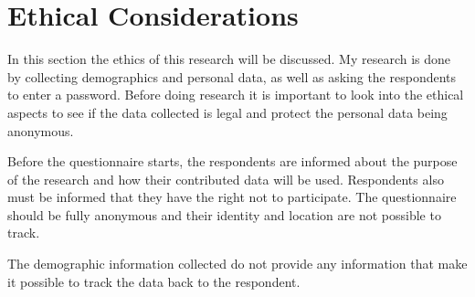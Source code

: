 \section{Ethical Considerations}

	In this section the ethics of this research will be discussed. My research is done by collecting demographics and personal data, as well as asking the respondents to enter a password. Before doing research it is important to look into the ethical aspects to see if the data collected is legal and protect the personal data being anonymous. 

	Before the questionnaire starts, the respondents are informed about the purpose of the research and how their contributed data will be used. Respondents also must be informed that they have the right not to participate. The questionnaire should be fully anonymous and their identity and location are not possible to track. 

	The demographic information collected do not provide any information that make it possible to track the data back to the respondent. 